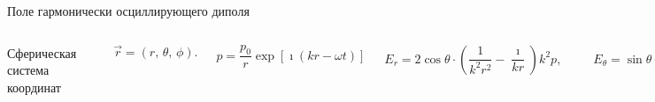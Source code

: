 \documentclass[9pt, compress, xcolor=table]{beamer}
\begin{document}
\begin{frame}{Поле гармонически осциллирующего диполя}

\begin{columns}[c]
\column{4.0cm}
\begin{center}
{\small Сферическая система координат}
\end{center}


\begin{center}
\includegraphics[scale=0.9]{SphericalCoordinates}
\end{center}
\begin{equation*}
\vec r=(r,\, \theta,\, \phi).
\end{equation*}

\column{7cm}

\begin{equation*}
p = \frac{p_0}{r} \exp \left[ \imath (kr - \omega t) \right]
\end{equation*}

\begin{equation*}
E_r = 2\cos\theta \cdot \left( \frac{1}{k^2r^2} - \frac{\imath}{kr} \right) k^2 p, 
\end{equation*}

\begin{equation*}
\quad E_{\theta} = \sin\theta \cdot \left( \frac{1}{k^2r^2} - \frac{\imath}{kr} - 1 \right) k^2 p,
\end{equation*}


\end{columns}
\end{frame}
\end{document}
